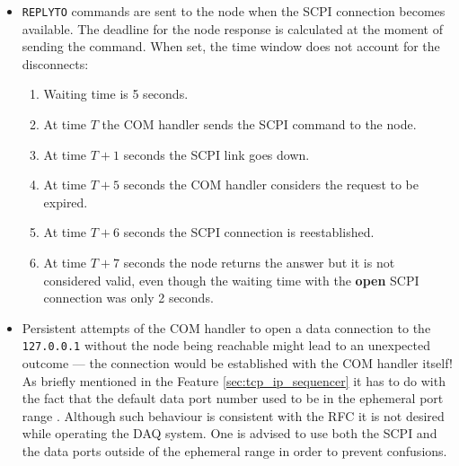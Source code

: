 \begin{itemize}
	\item{
		\texttt{REPLYTO} commands are sent to the node when the SCPI connection becomes available. The deadline for the node response is calculated at the moment of sending the command. When set, the time window does not account for the disconnects:
		\begin{enumerate}
			\item Waiting time is 5 seconds.
			\item At time $T$ the COM handler sends the SCPI command to the node.
			\item At time $T + 1$ seconds the SCPI link goes down.
			\item At time $T + 5$ seconds the COM handler considers the request to be expired.
			\item At time $T + 6$ seconds the SCPI connection is reestablished.
			\item At time $T + 7$ seconds the node returns the answer but it is not considered valid, even though the waiting time with the \textbf{open} SCPI connection was only 2 seconds.
		\end{enumerate}
	}
	\item Persistent attempts of the COM handler to open a data connection to the \texttt{127.0.0.1} without the node being reachable might lead to an unexpected outcome --- the connection would be established with the COM handler itself! As briefly mentioned in the Feature \ref{sec:tcp_ip_sequencer} it has to do with the fact that the default data port number used to be in the ephemeral port range \cite{RichardStevens1998, Touch2019}. Although such behaviour is consistent with the RFC \cite{Postel1981} it is not desired while operating the DAQ system. One is advised to use both the SCPI and the data ports outside of the ephemeral range in order to prevent confusions.
\end{itemize}